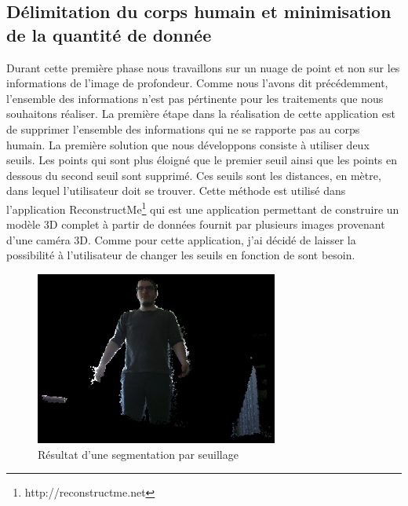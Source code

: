 \subsection{Délimitation du corps humain et minimisation de la quantité de donnée}
Durant cette première phase nous travaillons sur un nuage de point et non sur les informations de l'image de profondeur.
Comme nous l'avons dit précédemment, l'ensemble des informations n'est pas pértinente pour les traitements que nous souhaitons
réaliser. La première étape dans la réalisation de cette application est de supprimer l'ensemble des informations qui ne se rapporte pas 
au corps humain. La première solution que nous développons consiste à utiliser deux seuils. Les points qui sont plus éloigné que le 
premier seuil ainsi que les points en dessous du second seuil sont supprimé. 
Ces seuils sont les distances, en mètre, dans lequel l'utilisateur doit se trouver. Cette méthode est utilisé dans 
l'application ReconstructMe\footnote{http://reconstructme.net} qui est une application permettant de construire un modèle
3D complet à partir de données fournit par plusieurs images provenant d'une caméra 3D. Comme pour cette application, j'ai
décidé de laisser la possibilité à l'utilisateur de changer les seuils en fonction de sont besoin.\\

\begin{figure}[!ht]
  \begin{center}
    \includegraphics[width=8cm]{image/seuil1.PNG}
    \caption{Résultat d'une segmentation par seuillage}
    \label{fig:seuillage}
  \end{center}
\end{figure}

